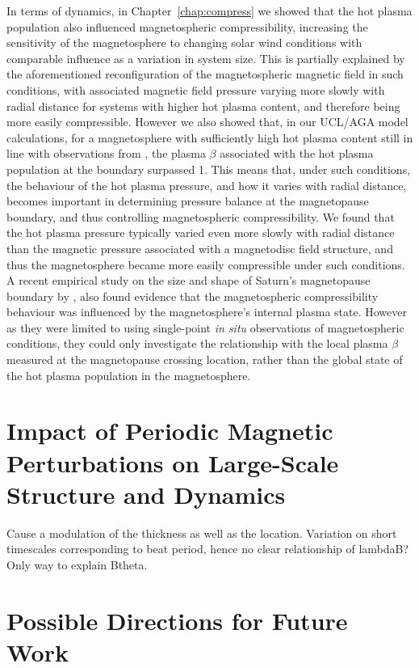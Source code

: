 In terms of dynamics, in Chapter~\ref{chap:compress} we showed that the hot plasma population also influenced magnetospheric compressibility, increasing the sensitivity of the magnetosphere to changing solar wind conditions with comparable influence as a variation in system size. This is partially explained by the aforementioned reconfiguration of the magnetospheric magnetic field in such conditions, with associated magnetic field pressure varying more slowly with radial distance for systems with higher hot plasma content, and therefore being more easily compressible. However we also showed that, in our UCL/AGA model calculations, for a magnetosphere with sufficiently high hot plasma content still in line with observations from \citet{sergis2007}, the plasma $\beta$ associated with the hot plasma population at the boundary surpassed 1. This means that, under such conditions, the behaviour of the hot plasma pressure, and how it varies with radial distance, becomes important in determining pressure balance at the magnetopause boundary, and thus controlling magnetospheric compressibility. We found that the hot plasma pressure typically varied even more slowly with radial distance than the magnetic pressure associated with a magnetodisc field structure, and thus the magnetosphere became more easily compressible under such conditions. A recent empirical study on the size and shape of Saturn's magnetopause boundary by  \citet{pilkington2015}, also found evidence that the magnetospheric compressibility behaviour was influenced by the magnetosphere's internal plasma state. However as they were limited to using single-point \textit{in situ} observations of magnetospheric conditions, they could only investigate the relationship with the local plasma $\beta$ measured at the magnetopause crossing location, rather than the global state of the hot plasma population in the magnetosphere.

\section{Impact of Periodic Magnetic Perturbations on Large-Scale Structure and Dynamics}
Cause a modulation of the thickness as well as the location. Variation on short timescales corresponding to beat period, hence no clear relationship of lambdaB? Only way to explain Btheta.

\section{Possible Directions for Future Work}
